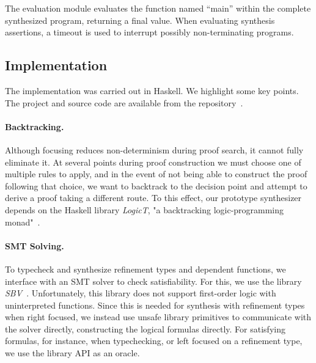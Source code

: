 \documentclass{llncs}
\newcommand{\mypara}[1]{\paragraph{\textbf{#1}.}}
\begin{document}
The evaluation module evaluates the function named ``main'' within the
complete synthesized program, returning a final value. When evaluating
synthesis assertions, a timeout is used to interrupt possibly non-terminating
programs.




\subsection{Implementation}

The implementation was carried out in Haskell. We highlight some key points. The
project and source code are available from the repository~\cite{sili_repo}.

\mypara{Backtracking} Although focusing reduces non-determinism
during proof search, it cannot fully eliminate it. At several points
during proof construction we must choose one of multiple rules to
apply, and in the event of not being able to construct the proof
following that choice, we want to backtrack to the decision point and
attempt to derive a proof taking a different route. To this effect,
our prototype synthesizer depends on the Haskell library \emph{LogicT}, "a backtracking
logic-programming monad"~\cite{logict}.

\mypara{SMT Solving} To typecheck and synthesize refinement types and
dependent functions, we interface with an SMT solver to check
satisfiability. For this, we use the library
\emph{SBV}~\cite{sbv}. Unfortunately, this library does not support
first-order logic with uninterpreted
functions. Since this is needed for synthesis with refinement types
when right focused, we instead use unsafe library primitives to
communicate with the solver directly, constructing the logical
formulas directly. For satisfying formulas, for instance, when
typechecking, or left focused on a refinement type, we use the library
API as an oracle.
\end{document}

